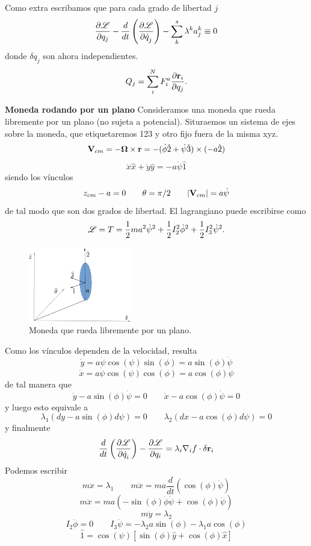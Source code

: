 \documentclass[10pt,oneside]{CBFT_book}
\begin{document}
Como extra escribamos que para cada grado de libertad $j$ 
\[
	\frac{\partial^{\hspace{-0.05em}} {\mathscr{L}}}{\partial {q_j}^{\hspace{-0.05em}}} - \frac{d}{dt}\left( \frac{\partial^{\hspace{-0.05em}} {\mathscr{L}}}{\partial {\dot{q}_j}^{\hspace{-0.05em}}} \right) - \sum_k^s \lambda^k a_j^k \equiv 0
\]
donde $\delta q_j$ son ahora independientes.
\[
	Q_j = \sum_i^N F_i^a \dpar{\vb{r}_i}{q_j}. 
\]

\begin{ejemplillo}{\bf Moneda rodando por un plano}
Consideramos una moneda que rueda libremente por un plano (no sujeta a potencial).
Situraemos un sistema de ejes sobre la moneda, que etiquetaremos 123 y otro fijo fuera
de la misma xyz.
\[
	\vb{V}_{cm} = -\vb{\Omega} \times \vb{r} =
	-(\dot{\phi}\hat{2} + \dot{\psi}\hat{3}) \times (-a\hat{2})
\]
\[
	\dot{x}\hat{x} + \dot{y}\hat{y} = -a \dot{\psi}\hat{1}
\]
siendo los vínculos
\[
	z_{cm} - a = 0 \qquad \theta=\pi/2 \qquad |\vb{V}_{cm}| = a\dot{\psi}
\]
de tal modo que son dos grados de libertad. El lagrangiano puede escribirse como 
\[
	\mathscr{L} = T = \frac{1}{2}m a^2 \dot{\psi}^2  + \frac{1}{2} I_2^2 \dot{\phi}^2 + \frac{1}{2} I_3^2\dot{\psi}^2.
\]

\begin{figure}
	\begin{center}
	\includegraphics[width=0.4\textwidth]{images/fig_moneda.pdf}	 
	\end{center}
	\caption{Moneda que rueda libremente por un plano.}
\end{figure} 

Como los vínculos dependen de la velocidad, resulta 
\[
	\dot{y} = a\dot{\psi} \cos(\psi) \sin(\phi) = a \sin(\phi) \dot{\psi}
\]
\[
	\dot{x} = a\dot{\psi} \cos(\psi) \cos(\phi) = a \cos(\phi) \dot{\psi}
\]
de tal manera que 
\[
	\dot{y} - a \sin(\phi) \dot{\psi} = 0 \qquad \dot{x} - a \cos(\phi) \dot{\psi} = 0
\]
y luego esto equivale a 
\[
	\lambda_1(dy - a \sin(\phi) d\psi) = 0 \qquad \lambda_2(dx - a \cos(\phi) d\psi)= 0
\]
y finalmente 
\[
	\frac{d}{dt}\left(\dpar{\Lag}{\dot{q}_i}\right) - \dpar{\Lag}{q_i} =
	\lambda_i \nabla_i f \cdot \delta \vb{r}_i
\]
Podemos escribir
\[
	m \ddot{x} = \lambda_1 \qquad m \ddot{x} = m a \frac{d}{dt}( \cos(\phi)\dot{\psi} )
\]
\[
	m \ddot{x} = m a ( -\sin(\phi)\dot{\phi}\dot{\psi} + \cos(\phi)\ddot{\psi} )
\]
\[
	m \ddot{y} = \lambda_2
\]
\[
	I_2\ddot{\phi} = 0 \qquad I_3\ddot{\psi} = - \lambda_2 a \sin(\phi) -\lambda_1 a \cos(\phi)
\]
\[
	\hat{1} = \cos(\psi)[\sin(\phi)\hat{y} + \cos(\phi)\hat{x}]
\]

\label{moneda}
\end{ejemplillo}
\end{document}
